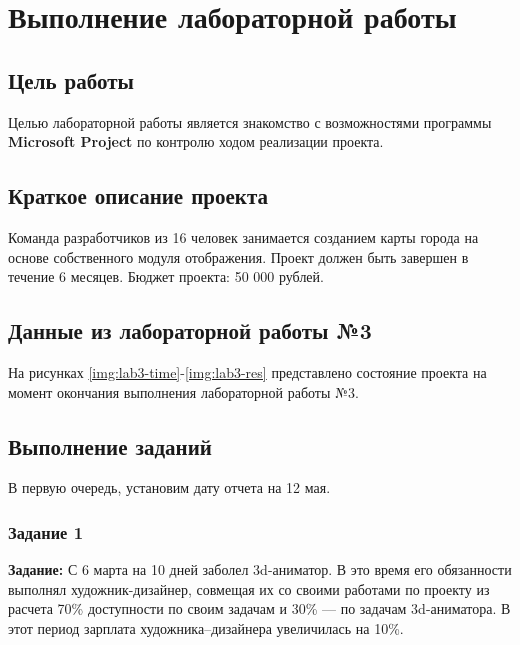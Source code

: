 \chapter{Выполнение лабораторной работы}


\section{Цель работы}

Целью лабораторной работы является знакомство с возможностями программы \textbf{Microsoft Project} по контролю ходом реализации проекта.


\section{Краткое описание проекта}

Команда разработчиков из 16 человек занимается созданием карты города на основе собственного модуля отображения. Проект должен быть завершен в течение 6 месяцев. Бюджет проекта: 50 000 рублей.


\section{Данные из лабораторной работы №3}

На рисунках \ref{img:lab3-time}-\ref{img:lab3-res} представлено состояние проекта на момент окончания выполнения лабораторной работы №3.



\section{Выполнение заданий}

В первую очередь, установим дату отчета на 12 мая.



\subsection{Задание 1}

\textbf{Задание:} С 6 марта на 10 дней заболел 3d-аниматор. В это время его обязанности выполнял художник-дизайнер, совмещая их со своими работами по проекту из расчета 70\% доступности по своим задачам и 30\% --- по задачам 3d-аниматора. В этот период зарплата художника–дизайнера увеличилась на 10\%.

